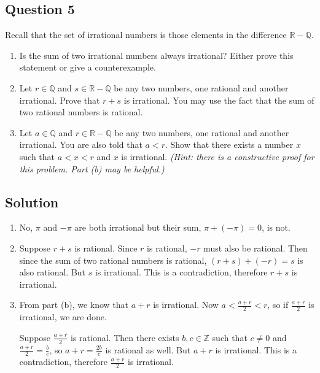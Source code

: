 \documentclass{article}
\begin{document}
\subsection*{Question 5}
    Recall that the set of irrational numbers is those elements in the difference $\mathbb{R} - \mathbb{Q}$.
    \begin{enumerate}
        \item Is the sum of two irrational numbers always irrational? Either prove this statement or give a counterexample.
        \item Let $r \in \mathbb{Q}$ and $s \in \mathbb{R} - \mathbb{Q}$ be any two numbers, one rational and another irrational. Prove that $r + s$ is irrational. You may use the fact that the sum of two rational numbers is rational.
        \item Let $a \in \mathbb{Q}$ and $r \in \mathbb{R} - \mathbb{Q}$ be any two numbers, one rational and another irrational. You are also told that $a < r$. Show that there exists a number $x$ such that $a < x < r$ and $x$ is irrational. \textit{(Hint: there is a constructive proof for this problem. Part (b) may be helpful.)}
    \end{enumerate}

\subsection*{Solution}
    \begin{enumerate}
        \item No, $\pi$ and $-\pi$ are both irrational but their sum, $\pi + (-\pi) = 0$, is not.
        \item Suppose $r + s$ is rational. Since $r$ is rational, $-r$ must also be rational. Then since the sum of two rational numbers is rational, $(r + s) + (-r) = s$ is also rational. But $s$ is irrational. This is a contradiction, therefore $r + s$ is irrational.
        \item From part (b), we know that $a + r$ is irrational. Now $a < \frac{a + r}{2} < r$, so if $\frac{a + r}{2}$ is irrational, we are done.
        
        \vspace{1.5mm}
        Suppose $\frac{a + r}{2}$ is rational. Then there exists $b, c \in \mathbb{Z}$ such that $c \ne 0$ and $\frac{a + r}{2} = \frac{b}{c}$, so $a + r = \frac{2b}{c}$ is rational as well. But $a + r$ is irrational. This is a contradiction, therefore $\frac{a + r}{2}$ is irrational.
    \end{enumerate}
\end{document}

